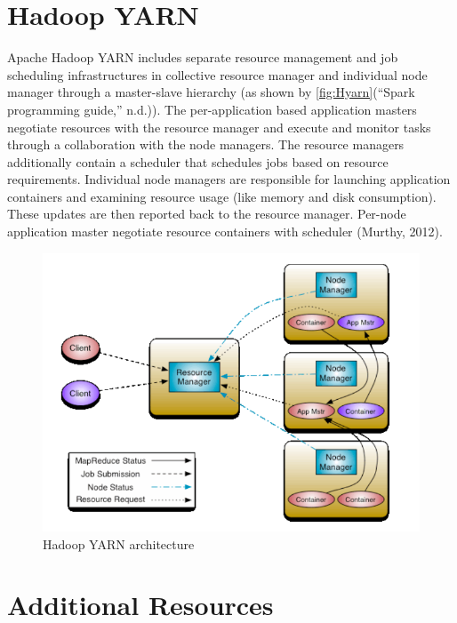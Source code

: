 \documentclass[12pt,twoside]{amherstthesis}
\begin{document}
  \section{Hadoop YARN}\label{hadoop-yarn}
  
  Apache Hadoop YARN includes separate resource management and job
  scheduling infrastructures in collective resource manager and individual
  node manager through a master-slave hierarchy (as shown by
  \autoref{fig:Hyarn}(``Spark programming guide,'' n.d.)). The
  per-application based application masters negotiate resources with the
  resource manager and execute and monitor tasks through a collaboration
  with the node managers. The resource managers additionally contain a
  scheduler that schedules jobs based on resource requirements. Individual
  node managers are responsible for launching application containers and
  examining resource usage (like memory and disk consumption). These
  updates are then reported back to the resource manager. Per-node
  application master negotiate resource containers with scheduler (Murthy,
  2012).
  
  \begin{figure}[htbp]
  \centering
  \includegraphics[scale = 0.5,angle = 0]{figure/yarn.png}
  \caption[Hadoop YARN architecture]{\normalsize{Hadoop YARN architecture}}
  \label{fig:Hyarn}
  \end{figure}
  
  \section{Additional Resources}\label{additional-resources}
  
\end{document}
